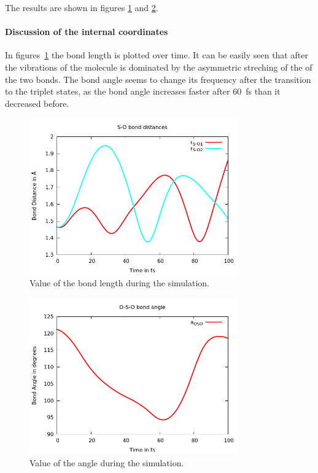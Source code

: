 \documentclass[a4paper,11pt,DIV=15,openany]{scrbook}
\begin{document}
\normalsize
The results are shown in figures \ref{fig:so} and \ref{fig:so_angle}.

\paragraph{Discussion of the internal coordinates} 

In figures~\ref{fig:so} the  bond length is plotted over time. It can be easily seen that after the vibrations of the molecule is dominated by the asymmetric streching of the of the two  bonds. The  bond angle seems to change its frequency after the transition to the triplet states, as the bond angle increases faster after 60~fs than it decreased before.

\begin{figure}[htb]
  \centering
  \includegraphics[width=0.8\textwidth]{figures/SO.png}
  \caption{Value of the  bond length during the simulation.}
  \label{fig:so}
\end{figure}

\begin{figure}[htb]
  \centering
  \includegraphics[width=0.8\textwidth]{figures/SO_angle.png}
  \caption{Value of the  angle during the simulation.}
  \label{fig:so_angle}
\end{figure}
\end{document}
